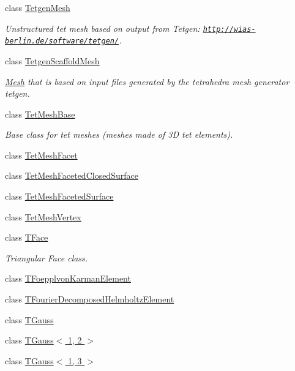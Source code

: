 \begin{DoxyCompactItemize}
class \hyperlink{classoomph_1_1TetgenMesh}{Tetgen\+Mesh}
\begin{DoxyCompactList}\small\item\em Unstructured tet mesh based on output from Tetgen\+: \href{http://wias-berlin.de/software/tetgen/}{\tt http\+://wias-\/berlin.\+de/software/tetgen/}. \end{DoxyCompactList}\item 
class \hyperlink{classoomph_1_1TetgenScaffoldMesh}{Tetgen\+Scaffold\+Mesh}
\begin{DoxyCompactList}\small\item\em \hyperlink{classoomph_1_1Mesh}{Mesh} that is based on input files generated by the tetrahedra mesh generator tetgen. \end{DoxyCompactList}\item 
class \hyperlink{classoomph_1_1TetMeshBase}{Tet\+Mesh\+Base}
\begin{DoxyCompactList}\small\item\em Base class for tet meshes (meshes made of 3D tet elements). \end{DoxyCompactList}\item 
class \hyperlink{classoomph_1_1TetMeshFacet}{Tet\+Mesh\+Facet}
\item 
class \hyperlink{classoomph_1_1TetMeshFacetedClosedSurface}{Tet\+Mesh\+Faceted\+Closed\+Surface}
\item 
class \hyperlink{classoomph_1_1TetMeshFacetedSurface}{Tet\+Mesh\+Faceted\+Surface}
\item 
class \hyperlink{classoomph_1_1TetMeshVertex}{Tet\+Mesh\+Vertex}
\item 
class \hyperlink{classoomph_1_1TFace}{T\+Face}
\begin{DoxyCompactList}\small\item\em Triangular Face class. \end{DoxyCompactList}\item 
class \hyperlink{classoomph_1_1TFoepplvonKarmanElement}{T\+Foepplvon\+Karman\+Element}
\item 
class \hyperlink{classoomph_1_1TFourierDecomposedHelmholtzElement}{T\+Fourier\+Decomposed\+Helmholtz\+Element}
\item 
class \hyperlink{classoomph_1_1TGauss}{T\+Gauss}
\item 
class \hyperlink{classoomph_1_1TGauss_3_011_00_012_01_4}{T\+Gauss$<$ 1, 2 $>$}
\item 
class \hyperlink{classoomph_1_1TGauss_3_011_00_013_01_4}{T\+Gauss$<$ 1, 3 $>$}
\item 

\end{DoxyCompactItemize}
